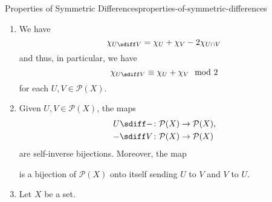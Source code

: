 \begin{proposition}{Properties of Symmetric Differences}{properties-of-symmetric-differences}
\begin{enumerate}
            \begin{align*}
                U\cap(V\sdiff W)  &= (U\cap V)\sdiff(U\cap W),\\
                (U\sdiff V)\cap W &= (U\cap W)\sdiff(V\cap W)
            \end{align*}
            for each $U,V,W\in\mathcal{P}(X)$.
        \item\label{properties-of-symmetric-differences-interaction-with-characteristic-functions}We have
            \[
                \chi_{U\sdiff V}%
                =%
                \chi_{U}%
                +%
                \chi_{V}%
                -%
                2\chi_{U\cap V}%
            \]%
            and thus, in particular, we have
            \[
                \chi_{U\sdiff V}%
                \equiv%
                \chi_{U}+\chi_{V}%
                \mod{2}%
            \]%
            for each $U,V\in\mathcal{P}(X)$.
        \item\label{properties-of-symmetric-differences-bijectivity}Given $U,V\in\mathcal{P}(X)$, the maps
            \begin{align*}
                U\sdiff-  &\colon \mathcal{P}(X) \to \mathcal{P}(X),\\
                -\sdiff V &\colon \mathcal{P}(X) \to \mathcal{P}(X)
            \end{align*}
            are self-inverse bijections. Moreover, the map
            \begin{webcompile}
            \end{webcompile}%
            is a bijection of $\mathcal{P}(X)$ onto itself sending $U$ to $V$ and $V$ to $U$.
        \item\label{properties-of-symmetric-differences-interaction-with-powersets-and-groups}Let $X$ be a set.
            \begin{enumerate}

\end{enumerate}
\end{enumerate}
\end{proposition}
